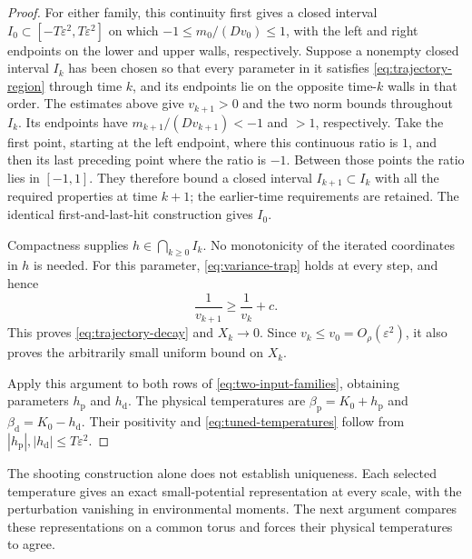 \begin{proof}
For either family, this continuity first gives a closed interval
\(I_0\subset[-T\varepsilon^2,T\varepsilon^2]\) on which
\(-1\le m_0/(Dv_0)\le1\), with the left and right endpoints on the
lower and upper walls, respectively.  Suppose a nonempty closed
interval \(I_k\) has been chosen so that every parameter in it satisfies
\eqref{eq:trajectory-region} through time \(k\), and its endpoints
lie on the opposite time-\(k\) walls in that order.  The estimates
above give \(v_{k+1}>0\) and the two norm bounds throughout \(I_k\).
Its endpoints have
\(m_{k+1}/(Dv_{k+1})<-1\) and \(>1\), respectively.  Take the first
point, starting at the left endpoint, where this continuous ratio is
\(1\), and then its last preceding point where the ratio is \(-1\).
Between those points the ratio lies in \([-1,1]\).  They therefore
bound a closed interval \(I_{k+1}\subset I_k\) with all the required
properties at time \(k+1\); the earlier-time requirements are retained.
The identical first-and-last-hit construction gives \(I_0\).

Compactness supplies \(h\in\bigcap_{k\ge0}I_k\).  No monotonicity of
the iterated coordinates in \(h\) is needed.  For this parameter,
\eqref{eq:variance-trap} holds at every step, and hence
\[
 \frac1{v_{k+1}}\ge\frac1{v_k}+c.
\]
This proves \eqref{eq:trajectory-decay} and \(X_k\to0\).
Since \(v_k\le v_0=O_\rho(\varepsilon^2)\), it also proves the
arbitrarily small uniform bound on \(X_k\).

Apply this argument to both rows of \eqref{eq:two-input-families},
obtaining parameters \(h_{\mathrm p}\) and \(h_{\mathrm d}\).
The physical temperatures are
\(\beta_{\mathrm p}=K_0+h_{\mathrm p}\) and
\(\beta_{\mathrm d}=K_0-h_{\mathrm d}\).  Their positivity and
\eqref{eq:tuned-temperatures} follow from
\(|h_{\mathrm p}|,|h_{\mathrm d}|\le T\varepsilon^2\).
\end{proof}

The shooting construction alone does not establish uniqueness.
Each selected temperature gives an exact
small-potential representation at every scale, with the perturbation
vanishing in environmental moments.  The next argument compares these
representations on a common torus and forces their physical temperatures
to agree.
